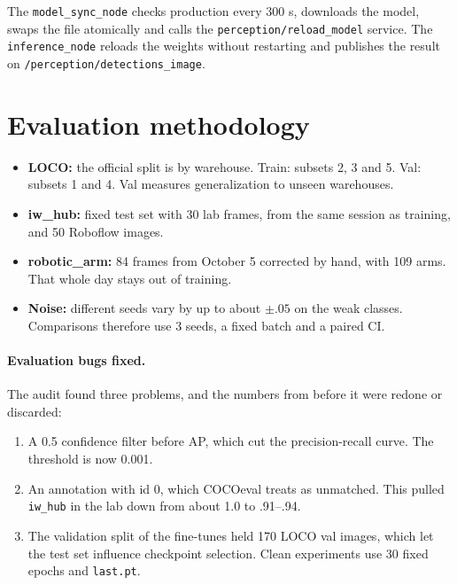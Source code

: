 \documentclass[11pt,a4paper]{article}
\begin{document}
The \texttt{model\_sync\_node} checks production every 300 s, downloads the model,
swaps the file atomically and calls the \texttt{perception/reload\_model} service.
The \texttt{inference\_node} reloads the weights without restarting and publishes
the result on \texttt{/perception/detections\_image}.

\section{Evaluation methodology}
\label{sec:method}

\begin{itemize}
  \item \textbf{LOCO:} the official split is by warehouse. Train: subsets 2, 3 and
    5. Val: subsets 1 and 4. Val measures generalization to unseen warehouses.
  \item \textbf{iw\_hub:} fixed test set with 30 lab frames, from the same session
    as training, and 50 Roboflow images.
  \item \textbf{robotic\_arm:} 84 frames from October 5 corrected by hand, with
    109 arms. That whole day stays out of training.
  \item \textbf{Noise:} different seeds vary by up to about $\pm.05$ on the weak
    classes. Comparisons therefore use 3 seeds, a fixed batch and a paired CI.
\end{itemize}

\paragraph{Evaluation bugs fixed.} The audit found three problems, and the numbers
from before it were redone or discarded:
\begin{enumerate}
  \item A 0.5 confidence filter before AP, which cut the precision-recall curve.
    The threshold is now 0.001.
  \item An annotation with id 0, which COCOeval treats as unmatched. This pulled
    \texttt{iw\_hub} in the lab down from about 1.0 to .91--.94.
  \item The validation split of the fine-tunes held 170 LOCO val images, which let
    the test set influence checkpoint selection. Clean experiments use 30 fixed
    epochs and \texttt{last.pt}.
\end{enumerate}

\end{document}
